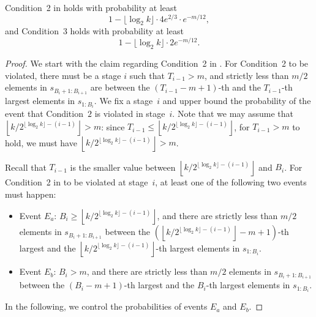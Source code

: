 \begin{lemma}\label{lemma:exact-cond-23}
    Condition~2 in  holds with probability at least
    \[
        1 - \lfloor\log_2 k \rfloor\cdot 4e^{2/3}\cdot e^{-m/12},
    \]
   and Condition~3 holds with probability at least
    \[
        1 - \lfloor\log_2 k \rfloor\cdot 2e^{-m/12}.
    \]
\end{lemma}

\begin{proof}
We start with the claim regarding Condition~2 in . For Condition~2 to be violated, there must be a stage $i$ such that $T_{i-1} > m$, and strictly less than $m/2$ elements in $s_{B_i +1:B_{i+1}}$ are between the $(T_{i-1}-m+1)$-th and the $ T_{i-1}$-th largest elements in $s_{1:B_i}$. We fix a stage~$i$ and upper bound the probability of the event that Condition~$2$ is violated in stage~$i$. Note that we may assume that $\left\lfloor k/2^{\lfloor\log_2 k\rfloor - (i-1)}\right\rfloor > m$: since $T_{i-1} \le \left\lfloor k/2^{\lfloor\log_2 k\rfloor - (i-1)}\right\rfloor$, for $T_{i-1} > m$ to hold, we must have $\left\lfloor k/2^{\lfloor\log_2 k\rfloor - (i-1)}\right\rfloor > m$.

Recall that $T_{i-1}$ is the smaller value between $\left\lfloor k/2^{\lfloor\log_2 k\rfloor - (i-1)}\right\rfloor$ and $B_i$. For Condition~2 in  to be violated at stage~$i$, at least one of the following two events must happen:
\begin{itemize}
    \item Event $E_a$: $B_i \ge \left\lfloor k/2^{\lfloor\log_2 k\rfloor - (i-1)}\right\rfloor$, and there are strictly less than $m/2$ elements in $s_{B_{i} + 1: B_{i+1}}$ between the $\left(\left\lfloor k/2^{\lfloor\log_2 k\rfloor - (i-1)}\right\rfloor - m+1\right)$-th largest  and the $\left\lfloor k/2^{\lfloor\log_2 k\rfloor - (i-1)}\right\rfloor$-th largest elements in $s_{1:B_i}$.
    \item Event $E_b$: $B_i > m$, and there are strictly less than $m/2$ elements in $s_{B_i + 1: B_{i+1}}$ between the $(B_i - m+1)$-th largest and the $B_i$-th largest elements in $s_{1:B_i}$.
\end{itemize}
In the following, we control the probabilities of events $E_a$ and $E_b$.


\end{proof}
